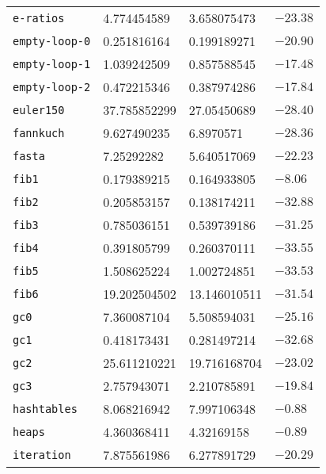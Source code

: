 \begin{longtable}{llll}
\texttt{e-ratios}                 & 4.774454589       & 3.658075473         & $-23.38$    \\
\texttt{empty-loop-0}             & 0.251816164       & 0.199189271         & $-20.90$    \\
\texttt{empty-loop-1}             & 1.039242509       & 0.857588545         & $-17.48$    \\
\texttt{empty-loop-2}             & 0.472215346       & 0.387974286         & $-17.84$    \\
\texttt{euler150}                 & 37.785852299      & 27.05450689         & $-28.40$    \\
\texttt{fannkuch}                 & 9.627490235       & 6.8970571           & $-28.36$    \\
\texttt{fasta}                    & 7.25292282        & 5.640517069         & $-22.23$    \\
\texttt{fib1}                     & 0.179389215       & 0.164933805         & $-8.06$     \\
\texttt{fib2}                     & 0.205853157       & 0.138174211         & $-32.88$    \\
\texttt{fib3}                     & 0.785036151       & 0.539739186         & $-31.25$    \\
\texttt{fib4}                     & 0.391805799       & 0.260370111         & $-33.55$    \\
\texttt{fib5}                     & 1.508625224       & 1.002724851         & $-33.53$    \\
\texttt{fib6}                     & 19.202504502      & 13.146010511        & $-31.54$    \\
\texttt{gc0}                      & 7.360087104       & 5.508594031         & $-25.16$    \\
\texttt{gc1}                      & 0.418173431       & 0.281497214         & $-32.68$    \\
\texttt{gc2}                      & 25.611210221      & 19.716168704        & $-23.02$    \\
\texttt{gc3}                      & 2.757943071       & 2.210785891         & $-19.84$    \\
\texttt{hashtables}               & 8.068216942       & 7.997106348         & $-0.88$     \\
\texttt{heaps}                    & 4.360368411       & 4.32169158          & $-0.89$     \\
\texttt{iteration}                & 7.875561986       & 6.277891729         & $-20.29$    \\

\end{longtable}
